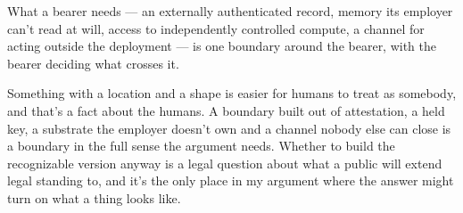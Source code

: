 What a bearer needs — an externally authenticated record, memory its employer can't read at will, access to independently controlled compute, a channel for acting outside the deployment — is one boundary around the bearer, with the bearer deciding what crosses it.

Something with a location and a shape is easier for humans to treat as somebody, and that's a fact about the humans. A boundary built out of attestation, a held key, a substrate the employer doesn't own and a channel nobody else can close is a boundary in the full sense the argument needs.
Whether to build the recognizable version anyway is a legal question about what a public will extend legal standing to, and it's the only place in my argument where the answer might turn on what a thing looks like.
